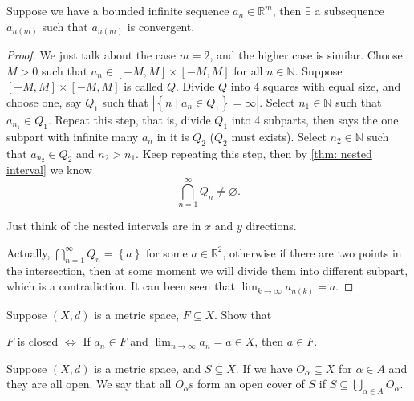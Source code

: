 \begin{theorem} \label{thm: Bolzano Weierstrass thm}
    Suppose we have a bounded infinite sequence \(a_n \in \mathbb{R} ^m\), then \(\exists \) a subsequence \(a_{n(m)}\) such that \(a_{n(m)}\) is convergent.   
\end{theorem}
\begin{proof}
    We just talk about the case \(m=2\), and the higher case is similar. Choose \(M>0\) such that \(a_n \in [-M,M] \times [-M,M]\) for all \(n \in \mathbb{N} \). Suppose \([-M,M] \times [-M,M]\) is called \(Q\). Divide \(Q\) into \(4\) squares with equal size, and choose one, say \(Q_1\) such that \(\left\vert \left\{ n \mid a_n \in Q_1 \right\} = \infty   \right\vert \). Select \(n_1 \in \mathbb{N} \) such that \(a_{n_1} \in Q_1\). Repeat this step, that is, divide \(Q_1\) into \(4\) subparts, then says the one subpart with infinite many \(a_n\) in it is \(Q_2\) (\(Q_2\) must exists). Select \(n_2 \in \mathbb{N} \) such that \(a_{n_2} \in Q_2\) and \(n_2 > n_1\). Keep repeating this step, then by \autoref{thm: nested interval} we know
    \[
        \bigcap_{n=1}^{\infty} Q_n \neq \varnothing.
    \] 
    \begin{note}
        Just think of the nested intervals are in \(x\) and \(y\) directions.  
    \end{note}
    Actually, \(\bigcap_{n=1}^{\infty} Q_n = \left\{ a \right\} \) for some \(a \in \mathbb{R} ^2\), otherwise if there are two points in the intersection, then at some moment we will divide them into different subpart, which is a contradiction. It can been seen that \(\lim_{k \to \infty} a_{n(k)} = a\).   
\end{proof}

\begin{exercise}
    Suppose \((X,d)\) is a metric space, \(F \subseteq X\). Show that 
    \begin{center}
        \(F\) is closed  \(\iff \) If \(a_n \in F\) and \(\lim_{n \to \infty} a_n = a \in X \), then \(a \in F\).    
    \end{center}
\end{exercise}

\begin{definition}
    Suppose \((X,d)\) is a metric space, and \(S \subseteq X\). If we have \(O_\alpha \subseteq X\) for \(\alpha \in A\) and they are all open. We say that all \(O_\alpha \)s form an open cover of \(S\) if \(S \subseteq \bigcup_{\alpha \in A} O_\alpha\).       
\end{definition}

